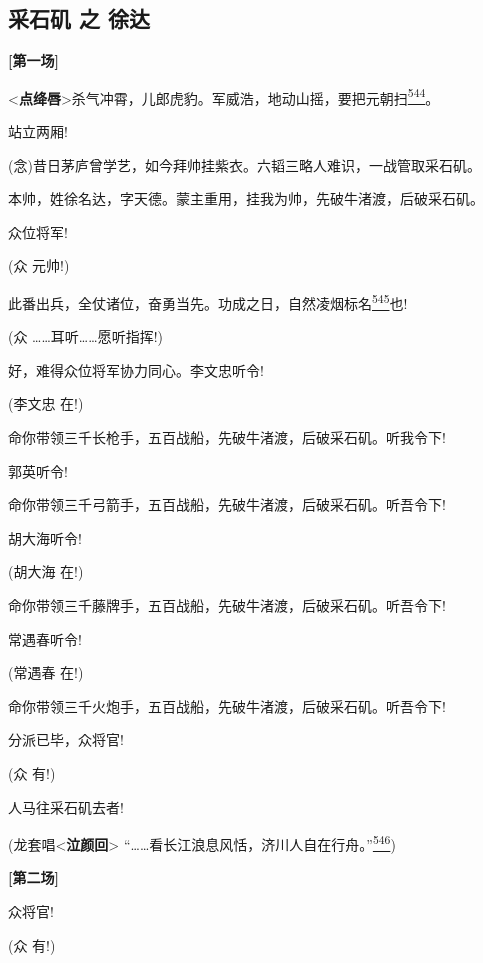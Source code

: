 \newpage
{} %
\hypertarget{ux91c7ux77f3ux77f6-ux4e4b-ux5f90ux8fbe}{%
\subsection{采石矶 之
徐达}\label{ux91c7ux77f3ux77f6-ux4e4b-ux5f90ux8fbe}}

\textbf{{[}第一场{]}}

\textless{}\textbf{点绛唇}\textgreater{}杀气冲霄，儿郎虎豹。军威浩，地动山摇，要把元朝扫\protect\hyperlink{fn544}{\textsuperscript{544}}。

站立两厢!

(念)昔日茅庐曾学艺，如今拜帅挂紫衣。六韬三略人难识，一战管取采石矶。

本帅，姓徐名达，字天德。蒙主重用，挂我为帅，先破牛渚渡，后破采石矶。

众位将军!

(众 元帅!)

此番出兵，全仗诸位，奋勇当先。功成之日，自然凌烟标名\protect\hyperlink{fn545}{\textsuperscript{545}}也!

(众 \ldots{}\ldots{}耳听\ldots{}\ldots{}愿听指挥!)

好，难得众位将军协力同心。李文忠听令!

(李文忠 在!)

命你带领三千长枪手，五百战船，先破牛渚渡，后破采石矶。听我令下!

郭英听令!

命你带领三千弓箭手，五百战船，先破牛渚渡，后破采石矶。听吾令下!

胡大海听令!

(胡大海 在!)

命你带领三千藤牌手，五百战船，先破牛渚渡，后破采石矶。听吾令下!

常遇春听令!

(常遇春 在!)

命你带领三千火炮手，五百战船，先破牛渚渡，后破采石矶。听吾令下!

分派已毕，众将官!

(众 有!)

人马往采石矶去者!

(龙套唱\textless{}\textbf{泣颜回}\textgreater{}
``\ldots{}\ldots{}看长江浪息风恬，济川人自在行舟。''\protect\hyperlink{fn546}{\textsuperscript{546}})

\textbf{{[}第二场{]}}

众将官!

(众 有!)


